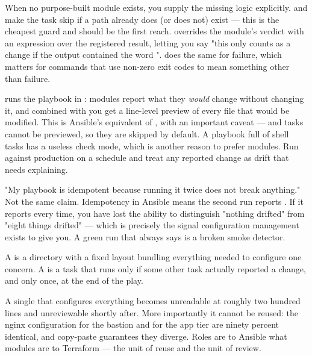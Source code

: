  When no purpose-built module exists, you supply the missing logic explicitly.  and  make the task skip if a path already does (or does not) exist --- this is the cheapest guard and should be the first reach.  overrides the module's verdict with an expression over the registered result, letting you say "this only counts as a change if the output contained the word ".  does the same for failure, which matters for commands that use non-zero exit codes to mean something other than failure.

\begin{autotip}
 runs the playbook in : modules report what they \emph{would} change without changing it, and combined with  you get a line-level preview of every file that would be modified. This is Ansible's equivalent of , with an important caveat ---  and  tasks cannot be previewed, so they are skipped by default. A playbook full of shell tasks has a useless check mode, which is another reason to prefer modules. Run  against production on a schedule and treat any reported change as drift that needs explaining.
\end{autotip}

\begin{misconception}
"My playbook is idempotent because running it twice does not break anything." Not the same claim. Idempotency in Ansible means the second run reports . If it reports  every time, you have lost the ability to distinguish "nothing drifted" from "eight things drifted" --- which is precisely the signal configuration management exists to give you. A green run that always says  is a broken smoke detector.
\end{misconception}


 A  is a directory with a fixed layout bundling everything needed to configure one concern. A  is a task that runs only if some other task actually reported a change, and only once, at the end of the play.

 A single  that configures everything becomes unreadable at roughly two hundred lines and unreviewable shortly after. More importantly it cannot be reused: the nginx configuration for the bastion and for the app tier are ninety percent identical, and copy-paste guarantees they diverge. Roles are to Ansible what modules are to Terraform --- the unit of reuse and the unit of review.

